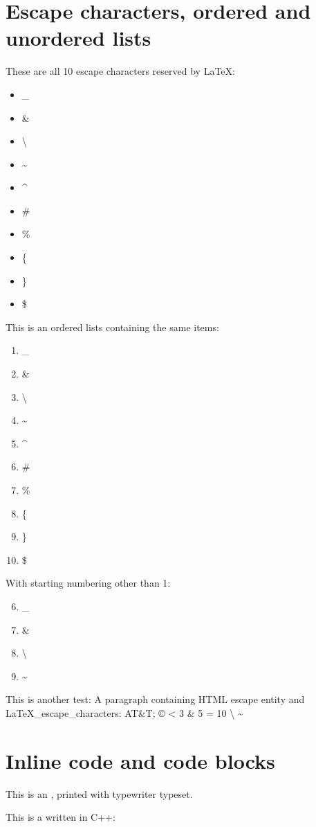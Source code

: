 \chapter*{Escape characters, ordered and unordered lists}
\par These are all 10 escape characters reserved by LaTeX:
\begin{itemize}
\item  \_
\item  \&
\item  \textbackslash{}
\item  \textasciitilde{}
\item  \textasciicircum{}
\item  \#
\item  \%
\item  \{
\item  \}
\item  \$
\end{itemize}
\par This is an ordered lists containing the same items:
\begin{enumerate}
\item  \_
\item  \&
\item  \textbackslash{}
\item  \textasciitilde{}
\item  \textasciicircum{}
\item  \#
\item  \%
\item  \{
\item  \}
\item  \$
\end{enumerate}
\par With starting numbering other than 1:
\begin{enumerate}
\setcounter{enumi}{5}
\item  \_
\item  \&
\item  \textbackslash{}
\item  \textasciitilde{}
\end{enumerate}
\par This is another test:
A paragraph containing HTML escape entity and LaTeX\_escape\_characters: AT\&T; © < 3 \& 5 = 10 \textbackslash{} \textasciitilde{}
\chapter*{Inline code and code blocks}
\par This is an , printed with typewriter typeset.
\par This is a  written in C++:

